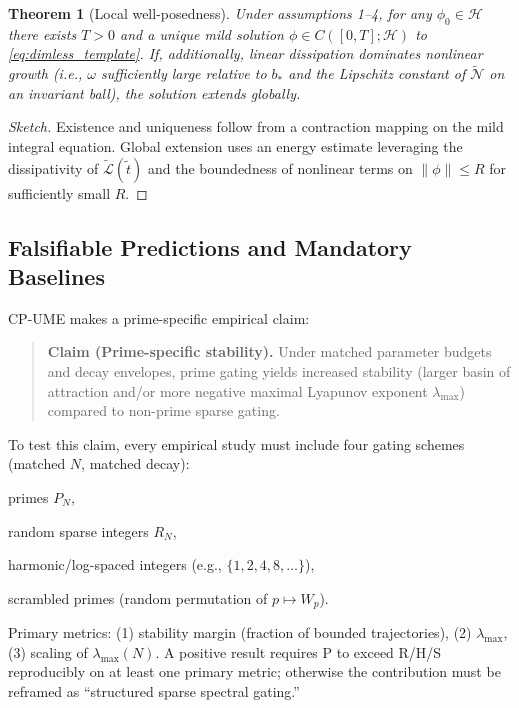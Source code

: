 \documentclass{article}
\theoremstyle{plain}
\newtheorem{theorem}{Theorem}
\begin{document}
\begin{theorem}[Local well-posedness]
Under assumptions 1--4, for any $\phi_0\in\mathcal{H}$ there exists $T>0$ and a unique mild solution $\phi\in C([0,T];\mathcal{H})$ to \eqref{eq:dimless_template}. If, additionally, linear dissipation dominates nonlinear growth (i.e., $\omega$ sufficiently large relative to $b_*$ and the Lipschitz constant of $\tilde{\mathcal{N}}$ on an invariant ball), the solution extends globally.
\end{theorem}

\begin{proof}[Sketch]
Existence and uniqueness follow from a contraction mapping on the mild integral equation. Global extension uses an energy estimate leveraging the dissipativity of $\tilde{\mathcal{L}}(\tilde{t})$ and the boundedness of nonlinear terms on $\|\phi\|\le R$ for sufficiently small $R$.
\end{proof}

\subsection{Falsifiable Predictions and Mandatory Baselines}

CP-UME makes a prime-specific empirical claim:

\begin{quote}
\textbf{Claim (Prime-specific stability).} Under matched parameter budgets and decay envelopes, prime gating yields increased stability (larger basin of attraction and/or more negative maximal Lyapunov exponent $\lambda_{\max}$) compared to non-prime sparse gating.
\end{quote}

To test this claim, every empirical study must include four gating schemes (matched $N$, matched decay):
\begin{description}[leftmargin=3em]
\item[P] primes $P_N$,
\item[R] random sparse integers $R_N$,
\item[H] harmonic/log-spaced integers (e.g., $\{1,2,4,8,\dots\}$),
\item[S] scrambled primes (random permutation of $p\mapsto W_p$).
\end{description}
Primary metrics: (1) stability margin (fraction of bounded trajectories), (2) $\lambda_{\max}$, (3) scaling of $\lambda_{\max}(N)$. A positive result requires P to exceed R/H/S reproducibly on at least one primary metric; otherwise the contribution must be reframed as ``structured sparse spectral gating.''

\nocite{*}


\end{document}
